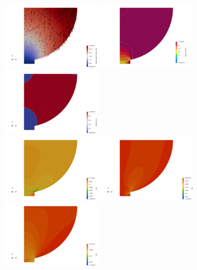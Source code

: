\begin{center}
\includegraphics[width=5cm]{python_codes/fieldstone_63/results/disp}
\includegraphics[width=5cm]{python_codes/fieldstone_63/results/sigma1}
\includegraphics[width=5cm]{python_codes/fieldstone_63/results/tensilezone}\\
\includegraphics[width=5cm]{python_codes/fieldstone_63/results/exx}
\includegraphics[width=5cm]{python_codes/fieldstone_63/results/exy}
\includegraphics[width=5cm]{python_codes/fieldstone_63/results/eyy}\\

\end{center}
